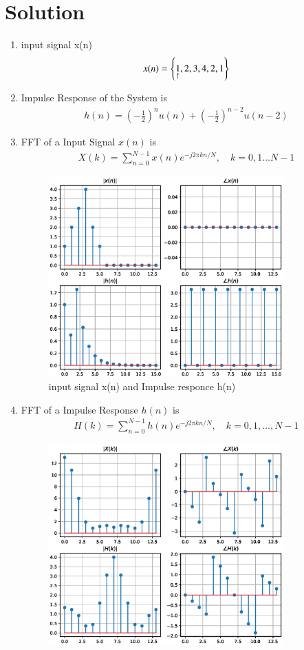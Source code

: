 \documentclass[journal,12pt,twocolumn]{IEEEtran}
\renewcommand\thesection{\arabic{section}}
\begin{document}
\section{Solution}
\begin{enumerate}[label=\thesection.\arabic*.,ref=\thesection.\theenumi]

\item input signal x(n)
\begin{align}
    x(n) = \left\{\underset{\uparrow}{1},2,3,4,2,1\right\} 
\end{align}
\item Impulse Response of the System is
\begin{align}
    h(n)=\left(-\frac{1}{2}\right)^{n} u(n)+\left(-\frac{1}{2}\right)^{n-2} u(n-2)	
\end{align}
\item FFT of a Input Signal $x(n)$ is 
\begin{align}
    X(k) = \sum_{n=0}^{N-1} x(n) e^{-j 2 \pi k n / N}, \quad k=0,1 \ldots N-1
\end{align}
 \begin{figure}[h!]
    \centering
    \includegraphics[width=9cm]{figs/xh_1.eps}
    \caption{input signal x(n) and Impulse responce h(n)}
    \label{yn}
\end{figure}
\item FFT of a Impulse Response $h(n)$ is 
\begin{align}
    H(k) = \sum_{n=0}^{N-1} h(n) e^{-j 2 \pi k n / N}, \quad k=0,1, \ldots, N-1
\end{align}
\begin{figure}[]
    \centering
    \includegraphics[width=9cm]{figs/XH_fft.eps}

\end{figure}
\end{enumerate}
\end{document}
